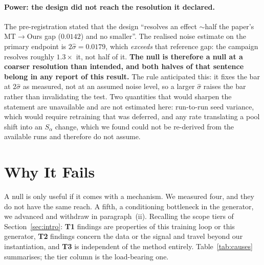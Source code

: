 \documentclass{article}
\begin{document}
\paragraph{Power: the design did not reach the resolution it declared.}
The pre-registration stated that the design ``resolves an effect $\sim$half the
paper's MT$\rightarrow$Ours gap ($0.0142$) and no smaller''. The realised noise
estimate on the primary endpoint is $2\hat{\sigma} = 0.0179$, which
\emph{exceeds} that reference gap: the campaign resolves roughly $1.3\times$ it,
not half of it. \textbf{The null is therefore a null at a coarser resolution
than intended, and both halves of that sentence belong in any report of this
result.}
The rule anticipated this: it fixes the bar at $2\hat{\sigma}$ as measured, not
at an assumed noise level, so a larger $\hat{\sigma}$ raises the bar rather than
invalidating the test.
Two quantities that would sharpen the statement are unavailable and are not
estimated here: run-to-run seed variance, which would require retraining that
was deferred, and any rate translating a pool shift into an $S_\alpha$ change,
which we found could not be re-derived from the available runs and therefore do
not assume.

\section{Why It Fails}
\label{sec:causes}

A null is only useful if it comes with a mechanism. We measured four, and they
do not have the same reach. A fifth, a conditioning bottleneck in the generator,
we advanced and withdraw in paragraph~(ii). Recalling the scope tiers of
Section~\ref{sec:intro}: \textbf{T1} findings are properties of this training
loop or this generator, \textbf{T2} findings concern the data or the signal and
travel beyond our instantiation, and \textbf{T3} is independent of the method
entirely. Table~\ref{tab:causes} summarises; the tier column is the load-bearing
one.
\end{document}
